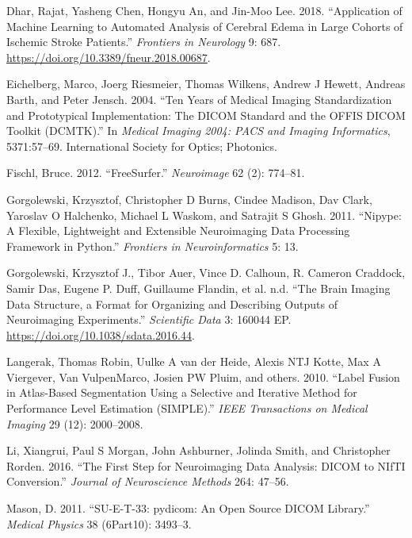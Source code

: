 \documentclass[]{elsarticle} %
\begin{document}
\leavevmode\hypertarget{ref-csfedema}{}%
Dhar, Rajat, Yasheng Chen, Hongyu An, and Jin-Moo Lee. 2018. ``Application of Machine Learning to Automated Analysis of Cerebral Edema in Large Cohorts of Ischemic Stroke Patients.'' \emph{Frontiers in Neurology} 9: 687. \url{https://doi.org/10.3389/fneur.2018.00687}.

\leavevmode\hypertarget{ref-dcmtk}{}%
Eichelberg, Marco, Joerg Riesmeier, Thomas Wilkens, Andrew J Hewett, Andreas Barth, and Peter Jensch. 2004. ``Ten Years of Medical Imaging Standardization and Prototypical Implementation: The DICOM Standard and the OFFIS DICOM Toolkit (DCMTK).'' In \emph{Medical Imaging 2004: PACS and Imaging Informatics}, 5371:57--69. International Society for Optics; Photonics.

\leavevmode\hypertarget{ref-freesurfer}{}%
Fischl, Bruce. 2012. ``FreeSurfer.'' \emph{Neuroimage} 62 (2): 774--81.

\leavevmode\hypertarget{ref-nipype}{}%
Gorgolewski, Krzysztof, Christopher D Burns, Cindee Madison, Dav Clark, Yaroslav O Halchenko, Michael L Waskom, and Satrajit S Ghosh. 2011. ``Nipype: A Flexible, Lightweight and Extensible Neuroimaging Data Processing Framework in Python.'' \emph{Frontiers in Neuroinformatics} 5: 13.

\leavevmode\hypertarget{ref-bids}{}%
Gorgolewski, Krzysztof J., Tibor Auer, Vince D. Calhoun, R. Cameron Craddock, Samir Das, Eugene P. Duff, Guillaume Flandin, et al. n.d. ``The Brain Imaging Data Structure, a Format for Organizing and Describing Outputs of Neuroimaging Experiments.'' \emph{Scientific Data} 3: 160044 EP. \url{https://doi.org/10.1038/sdata.2016.44}.

\leavevmode\hypertarget{ref-langerak2010label}{}%
Langerak, Thomas Robin, Uulke A van der Heide, Alexis NTJ Kotte, Max A Viergever, Van VulpenMarco, Josien PW Pluim, and others. 2010. ``Label Fusion in Atlas-Based Segmentation Using a Selective and Iterative Method for Performance Level Estimation (SIMPLE).'' \emph{IEEE Transactions on Medical Imaging} 29 (12): 2000--2008.

\leavevmode\hypertarget{ref-dcm2niix}{}%
Li, Xiangrui, Paul S Morgan, John Ashburner, Jolinda Smith, and Christopher Rorden. 2016. ``The First Step for Neuroimaging Data Analysis: DICOM to NIfTI Conversion.'' \emph{Journal of Neuroscience Methods} 264: 47--56.

\leavevmode\hypertarget{ref-pydicom}{}%
Mason, D. 2011. ``SU-E-T-33: pydicom: An Open Source DICOM Library.'' \emph{Medical Physics} 38 (6Part10): 3493--3.
\end{document}

